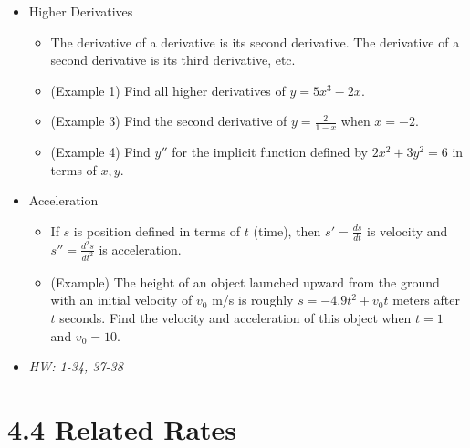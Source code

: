 \documentclass[11pt]{article}
\begin{document}
\begin{itemize}
\item Higher Derivatives
  \begin{itemize}
    \item The derivative of a derivative is its second derivative. The
          derivative of a second derivative is its third derivative, etc.
    \item (Example 1) Find all higher derivatives of \(y=5x^3-2x\).
    \item (Example 3) Find the second derivative of \(y=\frac{2}{1-x}\) when
          \(x=-2\).
    \item (Example 4) Find \(y''\) for the implicit function defined by
          \(2x^2+3y^2=6\) in terms of \(x,y\).
  \end{itemize}
\item Acceleration
  \begin{itemize}
    \item If \(s\) is position defined in terms of \(t\) (time), then
          \(s'=\frac{ds}{dt}\) is velocity and \(s''=\frac{d^2s}{dt^2}\)
          is acceleration.
    \item (Example) The height of an object launched upward from the ground
          with an initial velocity of \(v_0\) m/s is roughly
          \(s=-4.9t^2+v_0t\) meters after \(t\) seconds.
          Find the velocity and acceleration of this object when \(t=1\) and
          \(v_0=10\).
  \end{itemize}
\item\textit{
  HW: 1-34, 37-38
}
\end{itemize}

\section*{4.4 Related Rates}
\end{document}
